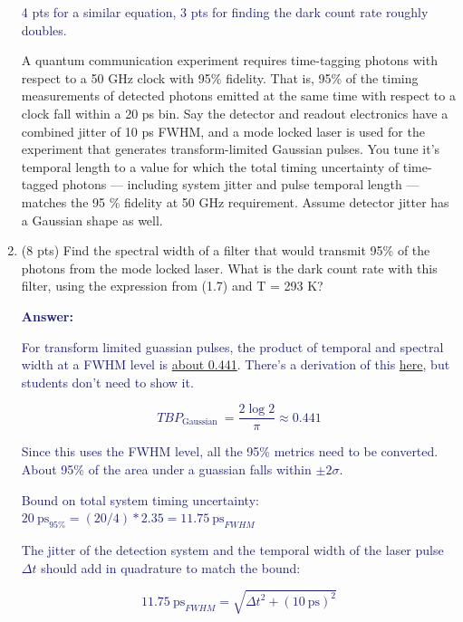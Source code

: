 \documentclass[11pt]{caltech_thesis} %
\begin{document}
\begin{enumerate}
  \textcolor{midnightblue}{4 pts for a similar equation, 3 pts for finding the dark count rate roughly doubles. }

  A quantum communication experiment requires time-tagging photons with respect to a 50 GHz clock with 95\% fidelity. That is, 95\% of the timing measurements of detected photons emitted at the same time with respect to a clock fall within a 20 ps bin. Say the detector and readout electronics have a combined jitter of 10 ps FWHM, and a mode locked laser is used for the experiment that generates transform-limited Gaussian pulses. You tune it's temporal length to a value for which the total timing uncertainty of time-tagged photons --- including system jitter and pulse temporal length --- matches the 95 \% fidelity at 50 GHz requirement. Assume detector jitter has a Gaussian shape as well.
\item
  (8 pts) Find the spectral width of a filter that would transmit 95\% of the photons from the mode locked laser. What is the dark count rate with this filter, using the expression from (1.7) and T = 293 K?

  \textcolor{midnightblue}{ \textbf{Answer:} }

  \textcolor{midnightblue}{For transform limited guassian pulses, the product of temporal and spectral width at a FWHM level is \href{https://www.lasercalculator.com/transform-limited-pulse-calculator/}{about 0.441}. There's a derivation of this \href{https://www.physicsforums.com/threads/time-bandwidth-product-ideal-mode-locking.171404/post-1339948}{here}, but students don't need to show it. }

  \textcolor{midnightblue}{

  $$T B P_{\text {Gaussian }}=\frac{2 \log 2}{\pi} \approx 0.441$$

  }

  \textcolor{midnightblue}{ Since this uses the FWHM level, all the 95\% metrics need to be converted. About 95\% of the area under a guassian falls within $\pm 2 \sigma$. }

  \textcolor{midnightblue}{ Bound on total system timing uncertainty: $20~\text{ps}_{95\%} = (20/4)*2.35 = 11.75~\text{ps}_{FWHM}$ }

  \textcolor{midnightblue}{ The jitter of the detection system and the temporal width of the laser pulse $\Delta t$ should add in quadrature to match the bound: }

  \textcolor{midnightblue}{

  $$ 11.75~\text{ps}_{FWHM} = \sqrt{ \Delta t^2 + (10~\text{ps})^2}$$

}
\end{enumerate}
\end{document}

